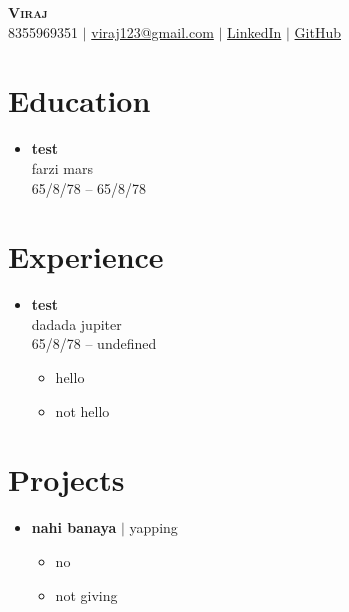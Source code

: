 \documentclass[letterpaper,11pt]{article}
\begin{document}
\begin{center}
    \textbf{\Huge \scshape Viraj} \\ \vspace{1pt}
    \small 8355969351 $|$ 
    \href{mailto:viraj123@gmail.com}{viraj123@gmail.com} $|$ 
    \href{https://www.linkedin.com/in/viraj-ap/}{LinkedIn} $|$
    \href{https://github.com/viraj-ap}{GitHub}
\end{center}

\section{Education}
\begin{itemize}[leftmargin=0.15in, label={}]

    \item \textbf{test} \\ 
    \small{farzi \hfill mars} \\
    \small{65/8/78 -- 65/8/78}

\end{itemize}

\section{Experience}
\begin{itemize}[leftmargin=0.15in, label={}]

    \item \textbf{test} \\ 
    \small{dadada \hfill jupiter} \\
    \small{65/8/78 -- undefined} \\
    \begin{itemize}
            \item hello
        \item not hello
    \end{itemize}

\end{itemize}

\section{Projects}
\begin{itemize}[leftmargin=0.15in, label={}]

    \item \textbf{nahi banaya} $|$ \small{yapping} \\
    \begin{itemize}
            \item no
        \item not giving
    \end{itemize}

\end{itemize}
\end{document}
